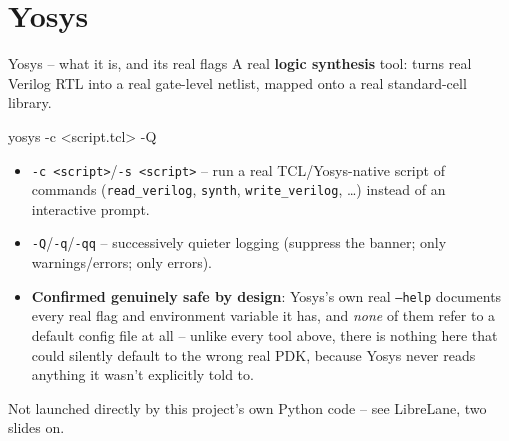 \documentclass[aspectratio=169]{beamer}
\begin{document}
\section{Yosys}
\begin{frame}[fragile]{Yosys -- what it is, and its real flags}
A real \textbf{logic synthesis} tool: turns real Verilog RTL into a
real gate-level netlist, mapped onto a real standard-cell library.
\begin{cli}
yosys -c <script.tcl> -Q
\end{cli}
\begin{itemize}
  \item \texttt{-c <script>}/\texttt{-s <script>} -- run a real
        TCL/Yosys-native script of commands (\texttt{read\_verilog},
        \texttt{synth}, \texttt{write\_verilog}, \dots) instead of an
        interactive prompt.
  \item \texttt{-Q}/\texttt{-q}/\texttt{-qq} -- successively quieter
        logging (suppress the banner; only warnings/errors; only
        errors).
  \item \textbf{Confirmed genuinely safe by design}: Yosys's own real
        \texttt{--help} documents every real flag and environment
        variable it has, and \emph{none} of them refer to a default
        config file at all -- unlike every tool above, there is
        nothing here that could silently default to the wrong real
        PDK, because Yosys never reads anything it wasn't explicitly
        told to.
\end{itemize}
Not launched directly by this project's own Python code -- see
LibreLane, two slides on.
\end{frame}

\end{document}
